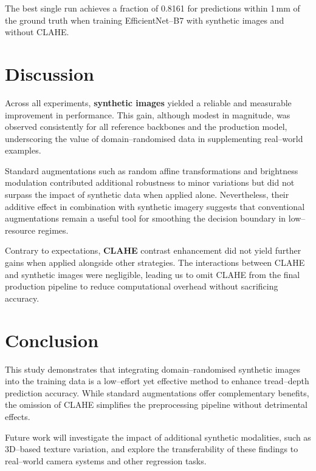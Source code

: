 \documentclass{article}
\begin{document}
The best single run achieves a fraction of 0.8161 for predictions within 1\,mm of the ground truth when training EfficientNet--B7 with synthetic images and without CLAHE.

\section{Discussion}
Across all experiments, \textbf{synthetic images} yielded a reliable and measurable improvement in performance. This gain, although modest in magnitude, was observed consistently for all reference backbones and the production model, underscoring the value of domain–randomised data in supplementing real–world examples.

Standard augmentations such as random affine transformations and brightness modulation contributed additional robustness to minor variations but did not surpass the impact of synthetic data when applied alone. Nevertheless, their additive effect in combination with synthetic imagery suggests that conventional augmentations remain a useful tool for smoothing the decision boundary in low–resource regimes.

Contrary to expectations, \textbf{CLAHE} contrast enhancement did not yield further gains when applied alongside other strategies. The interactions between CLAHE and synthetic images were negligible, leading us to omit CLAHE from the final production pipeline to reduce computational overhead without sacrificing accuracy.

\section{Conclusion}
This study demonstrates that integrating domain–randomised synthetic images into the training data is a low–effort yet effective method to enhance tread–depth prediction accuracy. While standard augmentations offer complementary benefits, the omission of CLAHE simplifies the preprocessing pipeline without detrimental effects.

Future work will investigate the impact of additional synthetic modalities, such as 3D–based texture variation, and explore the transferability of these findings to real–world camera systems and other regression tasks.
\end{document}
